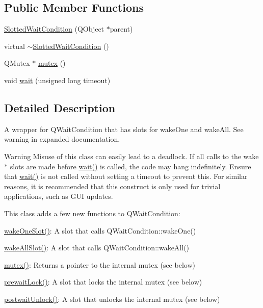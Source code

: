 \subsection*{Public Member Functions}
\begin{DoxyCompactItemize}
\item 
\hyperlink{classGlobalSearch_1_1SlottedWaitCondition_a4fd4c5343242d8961fd893012ba9f54b}{Slotted\-Wait\-Condition} (Q\-Object $\ast$parent)
\item 
virtual \hyperlink{classGlobalSearch_1_1SlottedWaitCondition_a5b504c643c03b6b9e2e30e4a7613f43c}{$\sim$\-Slotted\-Wait\-Condition} ()
\item 
Q\-Mutex $\ast$ \hyperlink{classGlobalSearch_1_1SlottedWaitCondition_af548d9a604d2ec84083e5c92ca1a3849}{mutex} ()
\item 
void \hyperlink{classGlobalSearch_1_1SlottedWaitCondition_a30999486ab4737cda3c4e93f8625ac1f}{wait} (unsigned long timeout)
\end{DoxyCompactItemize}


\subsection{Detailed Description}
A wrapper for Q\-Wait\-Condition that has slots for wake\-One and wake\-All. See warning in expanded documentation. 

\begin{DoxyWarning}{Warning}
Misuse of this class can easily lead to a deadlock. If all calls to the wake$\ast$ slots are made before \hyperlink{classGlobalSearch_1_1SlottedWaitCondition_a30999486ab4737cda3c4e93f8625ac1f}{wait()} is called, the code may hang indefinitely. Ensure that \hyperlink{classGlobalSearch_1_1SlottedWaitCondition_a30999486ab4737cda3c4e93f8625ac1f}{wait()} is not called without setting a timeout to prevent this. For similar reasons, it is recommended that this construct is only used for trivial applications, such as G\-U\-I updates.
\end{DoxyWarning}
This class adds a few new functions to Q\-Wait\-Condition\-:
\begin{DoxyItemize}
\item \hyperlink{classGlobalSearch_1_1SlottedWaitCondition_a26b060dde9c49345da5fe1c8dbd3374c}{wake\-One\-Slot()}\-: A slot that calls Q\-Wait\-Condition\-::wake\-One()
\item \hyperlink{classGlobalSearch_1_1SlottedWaitCondition_a4024066fe5db52f2e2c9257fcfbb5320}{wake\-All\-Slot()}\-: A slot that calls Q\-Wait\-Condition\-::wake\-All()
\item \hyperlink{classGlobalSearch_1_1SlottedWaitCondition_af548d9a604d2ec84083e5c92ca1a3849}{mutex()}\-: Returns a pointer to the internal mutex (see below)
\item \hyperlink{classGlobalSearch_1_1SlottedWaitCondition_afb1ba4315ffa2de59eaf5045d2a4c09f}{prewait\-Lock()}\-: A slot that locks the internal mutex (see below)
\item \hyperlink{classGlobalSearch_1_1SlottedWaitCondition_a3c9f9e3ba7eebdc3cc270445385e334c}{postwait\-Unlock()}\-: A slot that unlocks the internal mutex (see below)
\end{DoxyItemize}

